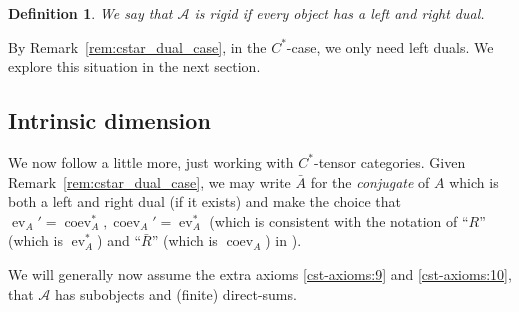 \documentclass[a4paper,11pt]{article}
\theoremstyle{plain}
\newtheorem{definition}[proposition]{Definition}
\theoremstyle{remark}
\newcommand{\mc}[1]{\mathcal{#1}}
\newcommand{\ev}{\operatorname{ev}}
\newcommand{\coev}{\operatorname{coev}}
\newcommand{\conj}[1]{\bar{#1}}
\begin{document}
\begin{definition}
We say that $\mc A$ is \emph{rigid} if every object has a left and right dual.
\end{definition}

By Remark~\ref{rem:cstar_dual_case}, in the $C^*$-case, we only need left duals.  We explore this situation in the next section.


\subsection{Intrinsic dimension}

We now follow \cite[Section~2.2]{NT_CQGsBook} a little more, just working with $C^*$-tensor categories.  Given Remark~\ref{rem:cstar_dual_case}, we may write $\conj{A}$ for the \emph{conjugate} of $A$ which is both a left and right dual (if it exists) and make the choice that $\ev_A' = \coev_A^*, \coev_A' = \ev_A^*$ (which is consistent with the notation of ``$R$'' (which is $\ev_A^*$) and ``$\conj{R}$'' (which is $\coev_A$) in \cite[Definition~2.2.1]{NT_CQGsBook}).

We will generally now assume the extra axioms \ref{cst-axioms:9} and \ref{cst-axioms:10}, that $\mc A$ has subobjects and (finite) direct-sums.  
\end{document}
